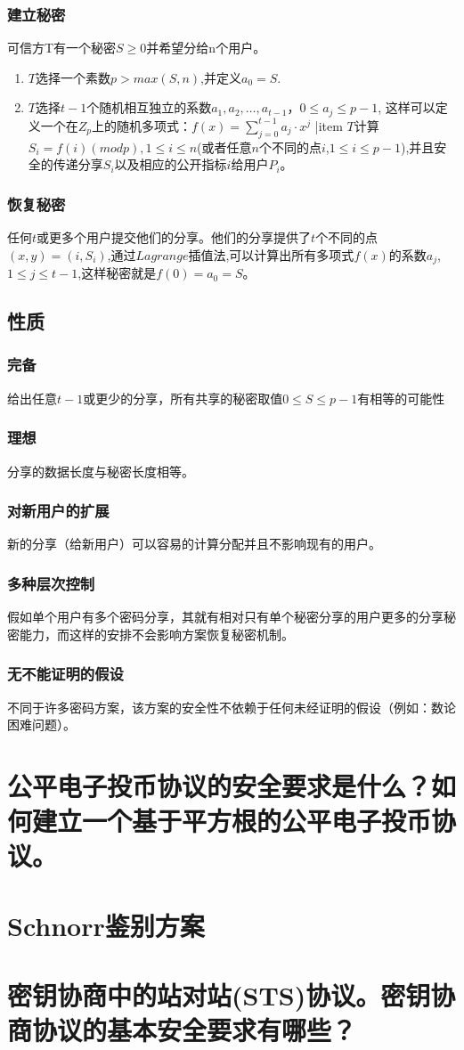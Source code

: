 \documentclass[11pt,a4paper]{article}
\begin{document}
\subsubsection{建立秘密} 可信方T有一个秘密$S\ge0$并希望分给n个用户。
\begin{enumerate}[1)]
\item $T$选择一个素数$p > max(S,n)$,并定义$a_0 = S$.
\item $T$选择$t-1$个随机相互独立的系数$a_1,a_2,\dots,a_{t-1}$，$0 \le a_j \le p-1$,
这样可以定义一个在$Z_p$上的随机多项式：$f(x)= \sum_{j=0}^{t-1}a_j· x^j$
|item $T$计算$S_i = f(i)(mod p) , 1 \le i \le n$(或者任意$n$个不同的点$i$,$1 \le i \le p-1$),并且安全的传递分享$S_i$以及相应的公开指标$i$给用户$P_i$。
\end{enumerate}

\subsubsection{恢复秘密} 任何$t$或更多个用户提交他们的分享。他们的分享提供了$t$个不同的点$(x,y)=(i, S_i)$,通过$Lagrange$插值法,可以计算出所有多项式$f(x)$的系数$a_j$,$1 \le j \le t-1$,这样秘密就是$f(0)=a_0=S$。
\subsection{性质}
\subsubsection{完备} 给出任意$t-1$或更少的分享，所有共享的秘密取值$0\le S \le p-1$有相等的可能性
\subsubsection{理想}分享的数据长度与秘密长度相等。
\subsubsection{对新用户的扩展}新的分享（给新用户）可以容易的计算分配并且不影响现有的用户。
\subsubsection{多种层次控制}假如单个用户有多个密码分享，其就有相对只有单个秘密分享的用户更多的分享秘密能力，而这样的安排不会影响方案恢复秘密机制。
\subsubsection{无不能证明的假设}不同于许多密码方案，该方案的安全性不依赖于任何未经证明的假设（例如：数论困难问题）。
\section{公平电子投币协议的安全要求是什么？如何建立一个基于平方根的公平电子投币协议。}

\section{Schnorr鉴别方案}

\section{密钥协商中的站对站(STS)协议。密钥协商协议的基本安全要求有哪些？}
\end{document}
